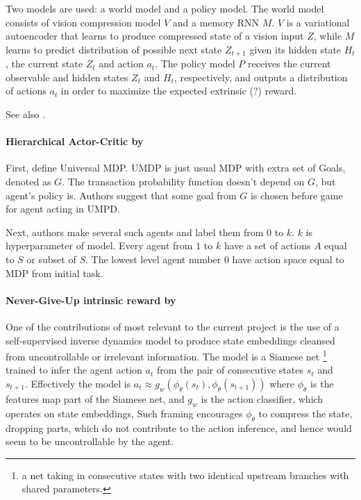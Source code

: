 \documentclass[acmsmall, nonacm]{acmart}
\begin{document}
Two models are used: a world model and a policy model. The world model consists of vision compression model $V$ and a memory RNN $M$. $V$ is a variational autoencoder that learns to produce compressed state of a vision input $Z$, while $M$ learns to predict distribution of possible next state $Z_{t+1}$ given its hidden state $H_t$, the current state $Z_t$ and action $a_t$. The policy model $P$ receives the current observable and hidden states $Z_t$ and $H_t$, respectively, and outputs a distribution of actions $a_t$ in order to maximize the expected extrinsic (?) reward.

See also \citep{watter_embed_2015}.


\paragraph{Hierarchical Actor-Critic by~\citet{levy2017learning}} %
\label{par:hierarchical_ac}

First, define Universal MDP. UMDP is just usual MDP with extra set of Goals, denoted as $G$. The transaction probability function doesn't depend on $G$, but agent's policy is. Authors suggest that some goal from $G$ is chosen before game for agent acting in UMPD.

Next, authors make several such agents and label them from $0$ to $k$. $k$ is hyperparameter of model. Every agent from $1$ to $k$ have a set of actions $A$ equal to $S$ or subset of $S$. The lowest level agent number $0$ have action space equal to MDP from initial task.


\paragraph{Never-Give-Up intrinsic reward by~\citet{badia_never_2020}} %
\label{par:never_give_up}

One of the contributions of most relevant to the current project is the use of a self-supervised inverse dynamics model to produce state embeddings cleansed from uncontrollable or irrelevant information.
%
The model is a Siamese net%
\footnote{
    a net taking in consecutive states with two identical upstream branches with shared parameters.
}
trained to infer the agent action $a_t$ from the pair of consecutive states $s_t$ and $s_{t+1}$. Effectively the model is $
    a_t \approx g_w(\phi_\theta(s_t), \phi_\theta(s_{t+1}))
$ where $\phi_\theta$ is the features map part of the Siamese net, and $g_w$ is the action classifier, which operates on state embeddings, Such framing encourages $\phi_\theta$ to compress the state, dropping parts, which do not contribute to the action inference, and hence would seem to be uncontrollable by the agent.
\end{document}

